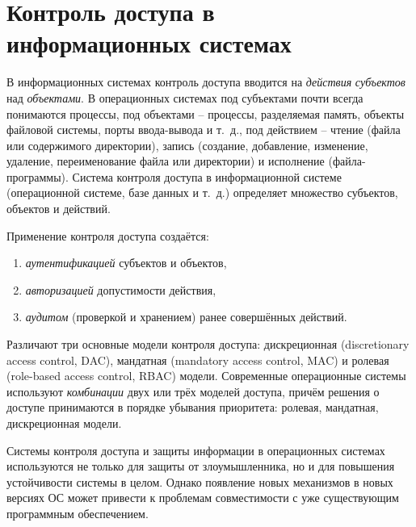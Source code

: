 \section[Контроль доступа в информационных системах]{Контроль доступа в \protect\\ информационных системах}


В информационных системах контроль доступа вводится на \emph{действия} \emph{субъектов} над \emph{объектами}. В операционных системах под субъектами почти всегда понимаются процессы, под объектами -- процессы, разделяемая память, объекты файловой системы, порты ввода-вывода и т.~д., под действием -- чтение (файла или содержимого директории), запись (создание, добавление, изменение, удаление, переименование файла или директории) и исполнение (файла-программы). Система контроля доступа в информационной системе (операционной системе, базе данных и т.~д.) определяет множество субъектов, объектов и действий.

Применение контроля доступа создаётся:

\begin{enumerate}
	\item \emph{аутентификацией} субъектов и объектов,
	\item \emph{авторизацией} допустимости действия,
	\item \emph{аудитом} (проверкой и хранением) ранее совершённых действий.
\end{enumerate}

Различают три основные модели контроля доступа: дискреционная (discretionary access control, DAC), мандатная (mandatory access control, MAC) и ролевая (role-based access control, RBAC) модели. Современные операционные системы используют \emph{комбинации} двух или трёх моделей доступа, причём решения о доступе принимаются в порядке убывания приоритета: ролевая, мандатная, дискреционная модели.

Системы контроля доступа и защиты информации в операционных системах используются не только для защиты от злоумышленника, но и для повышения устойчивости системы в целом. Однако появление новых механизмов в новых версиях ОС может привести к проблемам совместимости с уже существующим программным обеспечением.

